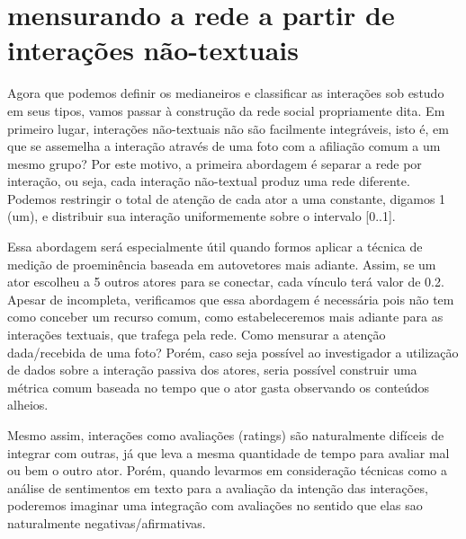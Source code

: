 \documentclass{article}
\begin{document}
\section{mensurando a rede a partir de interações não-textuais}

Agora que podemos definir os medianeiros e classificar as interações sob estudo
em seus tipos, vamos passar à construção da rede social propriamente dita. Em
primeiro lugar, interações não-textuais não são facilmente integráveis, isto é,
em que se assemelha a interação através de uma foto com a afiliação comum a
um mesmo grupo? Por este motivo, a primeira abordagem é separar a rede por
interação, ou seja, cada interação não-textual produz uma rede diferente.
Podemos restringir o total de atenção de cada ator a uma constante, digamos 1
(um), e distribuir sua interação uniformemente sobre o intervalo [0..1].

Essa abordagem será especialmente útil quando formos aplicar a técnica de
medição de proeminência baseada em autovetores mais adiante. Assim, se um
ator escolheu a 5 outros atores para se conectar, cada vínculo terá valor de
0.2. Apesar de incompleta, verificamos que essa abordagem é necessária pois não
tem como conceber um recurso comum, como estabeleceremos mais adiante para as
interações textuais, que trafega pela rede. Como mensurar a atenção
dada/recebida de uma foto? Porém, caso seja possível ao investigador a
utilização de dados sobre a interação passiva dos atores, seria possível
construir uma métrica comum baseada no tempo que o ator gasta observando os
conteúdos alheios.

Mesmo assim, interações como avaliações (ratings) são naturalmente difíceis de
integrar com outras, já que leva a mesma quantidade de tempo para avaliar mal ou
bem o outro ator. Porém, quando levarmos em consideração técnicas como a análise
de sentimentos em texto para a avaliação da intenção das interações, poderemos
imaginar uma integração com avaliações no sentido que elas sao naturalmente
negativas/afirmativas.
\end{document}

